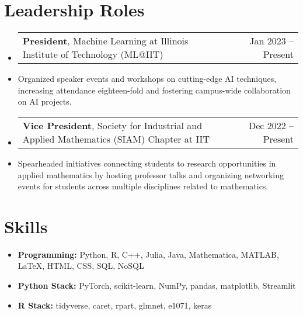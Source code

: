 \documentclass[letterpaper,10pt]{article}
\makeatletter
\newcommand{\resumeItem}[1]{
  \item\small{
    {#1 \vspace{-2pt}}
  }
}
\newcommand{\resumeSubSubheading}[2]{
    \item
    \normalsize
    \begin{tabular*}{0.97\textwidth}{l@{\extracolsep{\fill}}r}
      #1 & #2 \\
    \end{tabular*}\vspace{-7pt}
}
\newcommand{\resumeSubHeadingListStart}{\begin{itemize}[leftmargin=0.15in, label=]}
\newcommand{\resumeSubHeadingListEnd}{\end{itemize}}
\makeatother
\begin{document}
\section{Leadership Roles}
\resumeSubHeadingListStart
    \resumeSubSubheading{\textbf{President}, Machine Learning at Illinois Institute of Technology (ML@IIT)}{Jan 2023 -- Present}
    \resumeItem{Organized speaker events and workshops on cutting-edge AI techniques, increasing attendance eighteen-fold and fostering campus-wide collaboration on AI projects.}
    \resumeSubSubheading{\textbf{Vice President}, Society for Industrial and Applied Mathematics (SIAM) Chapter at IIT}{Dec 2022 -- Present}
    \resumeItem{Spearheaded initiatives connecting students to research opportunities in applied mathematics by hosting professor talks and organizing networking events for students across multiple disciplines related to mathematics.}
\resumeSubHeadingListEnd

\section{Skills}
\begin{itemize}[leftmargin=0.15in, label={}]
    \item \textbf{Programming:} Python, R, C++, Julia, Java, Mathematica, MATLAB, \LaTeX, HTML, CSS, SQL, NoSQL
    \item \vspace{-5pt} \textbf{Python Stack:} PyTorch, scikit-learn, NumPy, pandas, matplotlib, Streamlit
    \item \vspace{-5pt} \textbf{R Stack:} tidyverse, caret, rpart, glmnet, e1071, keras
\end{itemize}
\end{document}
